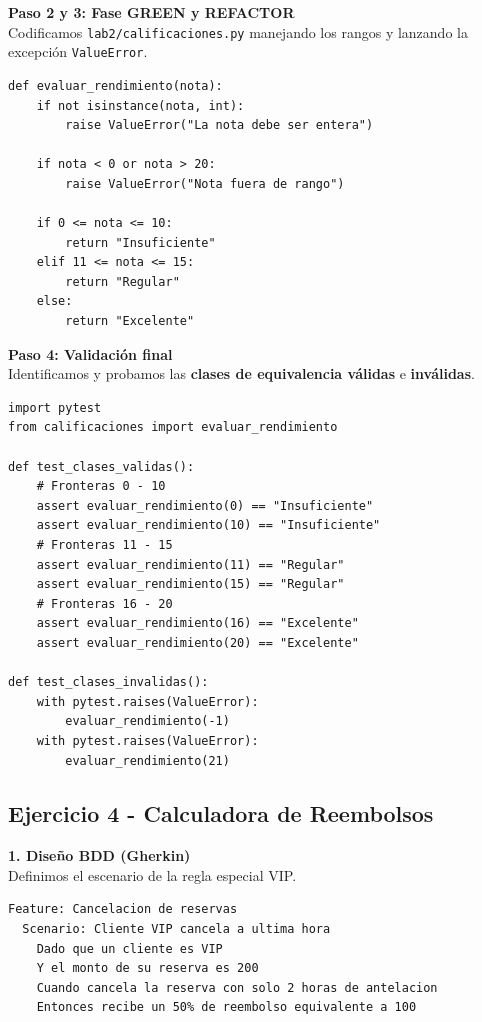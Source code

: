 \documentclass{article}
\begin{document}
\textbf{Paso 2 y 3: Fase GREEN y REFACTOR} \\
Codificamos \texttt{lab2/calificaciones.py} manejando los rangos y lanzando la excepción \texttt{ValueError}.
\begin{lstlisting}[caption={lab2/calificaciones.py (Implementación Final)}]
def evaluar_rendimiento(nota):
    if not isinstance(nota, int):
        raise ValueError("La nota debe ser entera")
        
    if nota < 0 or nota > 20:
        raise ValueError("Nota fuera de rango")
        
    if 0 <= nota <= 10:
        return "Insuficiente"
    elif 11 <= nota <= 15:
        return "Regular"
    else:
        return "Excelente"
\end{lstlisting}

\textbf{Paso 4: Validación final} \\
Identificamos y probamos las \textbf{clases de equivalencia válidas} e \textbf{inválidas}.
\begin{lstlisting}[caption={lab2/test\_calificaciones.py (Validación Final)}]
import pytest
from calificaciones import evaluar_rendimiento

def test_clases_validas():
    # Fronteras 0 - 10
    assert evaluar_rendimiento(0) == "Insuficiente"
    assert evaluar_rendimiento(10) == "Insuficiente"
    # Fronteras 11 - 15
    assert evaluar_rendimiento(11) == "Regular"
    assert evaluar_rendimiento(15) == "Regular"
    # Fronteras 16 - 20
    assert evaluar_rendimiento(16) == "Excelente"
    assert evaluar_rendimiento(20) == "Excelente"

def test_clases_invalidas():
    with pytest.raises(ValueError):
        evaluar_rendimiento(-1)
    with pytest.raises(ValueError):
        evaluar_rendimiento(21)
\end{lstlisting}

\subsection{Ejercicio 4 - Calculadora de Reembolsos}

\textbf{1. Diseño BDD (Gherkin)} \\
Definimos el escenario de la regla especial VIP.
\begin{lstlisting}[language=bash, caption={lab2/reembolso.feature}]
Feature: Cancelacion de reservas
  Scenario: Cliente VIP cancela a ultima hora
    Dado que un cliente es VIP
    Y el monto de su reserva es 200
    Cuando cancela la reserva con solo 2 horas de antelacion
    Entonces recibe un 50% de reembolso equivalente a 100
\end{lstlisting}
\end{document}
